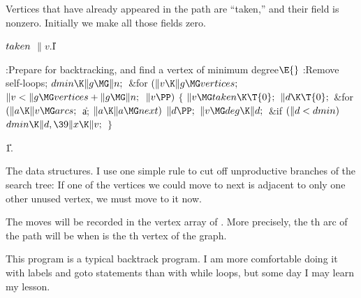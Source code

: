 Vertices that have already appeared in the path are ``taken,'' and
their  field is nonzero. Initially we make all those fields zero.

\Y\B\4\D$\\{taken}$ \5
$\|v.{}$\|I\par
\Y\B\4:Prepare  for backtracking, and find a vertex  of
minimum degree\X${}\E{}$\6
:Remove self-loops\X;\6
${}\\{dmin}\K\|g\MG\|n;{}$\6
\&{for} ${}(\|v\K\|g\MG\\{vertices};{}$ ${}\|v<\|g\MG\\{vertices}+\|g\MG\|n;{}$
${}\|v\PP){}$\5
${}\{{}$\1\6
${}\|v\MG\\{taken}\K\T{0};{}$\6
${}\|d\K\T{0};{}$\6
\&{for} ${}(\|a\K\|v\MG\\{arcs};{}$ \|a; ${}\|a\K\|a\MG\\{next}){}$\1\5
${}\|d\PP;{}$\2\6
${}\|v\MG\\{deg}\K\|d;{}$\6
\&{if} ${}(\|d<\\{dmin}){}$\1\5
${}\\{dmin}\K\|d,\39\|x\K\|v;{}$\2\6
\4${}\}{}$\2\par
\U1.\fi

The data structures. I use one simple rule to cut off unproductive
branches of the search tree: If one of the vertices we could move to next
is adjacent to only one other unused vertex, we must move to it now.

The moves will be recorded in the vertex array of . More precisely, the
th arc of the path will be  when  is the %
th vertex of
the graph.

This program is a typical backtrack program. I am more comfortable doing
it with labels and goto statements than with while loops, but some day
I may learn my lesson.

